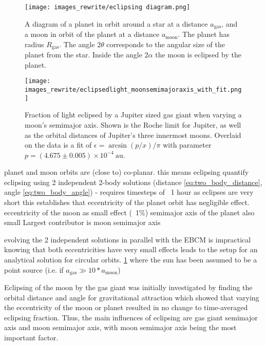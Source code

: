 \documentclass[12pt, onecolumn]{revtex4-2}    %
\begin{document}
\begin{figure}
  \texttt{[image: images\_rewrite/eclipsing diagram.png]}
  \caption{
    A diagram of a planet in orbit around a star at a distance $a_{\text{gas}}$, and a moon in orbit of the planet at a distance $a_{\text{moon}}$.
    The planet has radius $R_\text{gas}$.
    The angle $2\theta$ corresponds to the angular size of the planet from the star.
    Inside the angle $2\alpha$ the moon is eclipsed by the planet.
  }
  \label{fig:quantitative_eclipsing}
\end{figure}

\begin{figure}
  \texttt{[image: images\_rewrite/eclipsedlight\_moonsemimajoraxis\_with\_fit.png]}
  \caption{
    Fraction of light eclipsed by a Jupiter sized gas giant when varying a moon's semimajor axis.
    Shown is the Roche limit for Jupiter, as well as the orbital distances of Jupiter's three innermost moons.
    Overlaid on the data is a fit of $\epsilon = \arcsin(p/x)/\pi$ with parameter $p = (4.675\pm0.005)\times 10^{-4}\ \text{au}$.
  }
  \label{fig:quantitative_eclipsing_moon_semimajor_axis}
\end{figure}

planet and moon orbits are (close to) co-planar.
this means eclipsing
quantify eclipsing using 2 independent 2-body solutions (distance \eqref{eq:two_body_distance}, angle \eqref{eq:two_body_angle})
 - requires timesteps of ~1 hour as eclipses are very short
this establishes that eccentricity of the planet orbit has negligible effect.
eccentricity of the moon as small effect (~1\%)
semimajor axis of the planet also small
Largest contributor is moon semimajor axis

evolving the 2 independent solutions in parallel with the EBCM is impractical
knowing that both eccentricities have very small effects leads to the setup for an analytical solution for circular orbits.
\ref{fig:quantitative_eclipsing}
where the sun has been assumed to be a point source (i.e. if $a_\text{gas} \gg 10*a_\text{moon}$)

Eclipsing of the moon by the gas giant was initially investigated by finding the orbital distance and angle  for gravitational attraction which showed that varying the eccentricity of the moon or planet resulted in no change to time-averaged eclipsing fraction.
Thus, the main influences of eclipsing are gas giant semimajor axis and moon semimajor axis, with moon semimajor axis being the most important factor.
\end{document}
